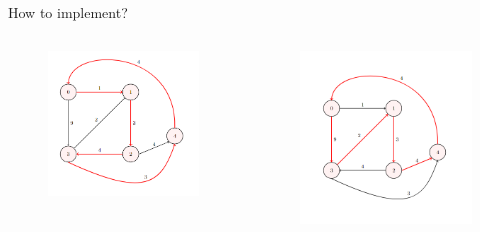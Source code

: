 \documentclass{beamer}
\begin{document}
\begin{frame}{How to implement?}
    \begin{columns}
    \begin{figure}[h]
        \centering
        \includegraphics[scale=0.45]{g2.png}
    \end{figure}
    \begin{figure}[h]
        \centering
        \includegraphics[scale=0.45]{g3.png}

\end{figure}
\end{columns}
\end{frame}
\end{document}
